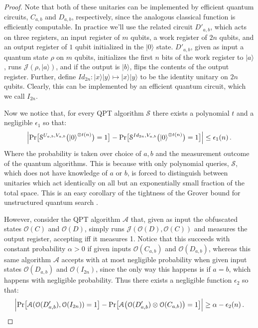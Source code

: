 \documentclass[11pt]{article}
\numberwithin{equation}{section}
\newcommand{\algo}{\mathcal}
\begin{document}
{\begin{proof}
Note that both of these unitaries can be implemented by efficient quantum circuits, $C_{a,b}$ and $D_{a,b}$, respectively, since the analogous classical function is efficiently computable.  In practice we'll use the related circuit $D'_{a,b}$, which acts on three registers, an input register of $m$ qubits, a work register of $2n$ qubits, and an output register of $1$ qubit initialized in the $|0\rangle$ state.  $D'_{a,b}$, given as input a quantum state $\rho$ on $m$ qubits, initializes the first $n$ bits of the work register to $|a\rangle$, runs $\mathcal{J}(\rho,|a\rangle)$, and if the output is $|b\rangle$, flips the contents of the output register.  Further, define $Id_{2n}:|x\rangle|y\rangle\longmapsto|x\rangle|y\rangle$ to be the identity unitary on $2n$ qubits.  Clearly, this can be implemented by an efficient quantum circuit, which we call $I_{2n}$.

Now we notice that, for every QPT algorithm $\mathcal S$ there exists a polynomial $t$ and a negligible $\epsilon_1$ so that:
\begin{equation}\label{eqn1}\Bigl| \text{Pr}\bigl[\mathcal S^{U_{a,b}, V_{a,b}}\bigl({\left\vert{0}\right\rangle}^{\otimes t(n)}\bigr) = 1\bigr]- \text{Pr}\bigl[\mathcal S^{Id_{2n}, V_{a,b}}\bigl({\left\vert{0}\right\rangle}^{\otimes t(n)}\bigr) = 1\bigr] \Bigr| \leq \epsilon_1(n)\,.\end{equation}
Where the probability is taken over choice of $a,b$ and the measurement outcome of the quantum algorithms.
 This is because with only polynomial queries, $\mathcal S$, which does not have knowledge of $a$ or $b$, is forced to distinguish between unitaries which act identically on all but an exponentially small fraction of the total space.  This is an easy corollary of the tightness of the Grover bound for unstructured quantum search \cite{BBBV}.
  
However, consider the QPT algorithm $\mathcal{A}$ that, given as input the obfuscated states $\mathcal{O}(C)$ and $\mathcal{O}(D)$, simply runs $\mathcal{J}(\mathcal{O}(D),\mathcal{O}(C))$ and measures the output register, accepting iff it measures 1.  Notice that this succeeds with constant probability $\alpha>0$ if given inputs $\mathcal{O}(C_{a,b})$ and $\mathcal{O}(D_{a,b})$, whereas this same algorithm $\algo A$ accepts with at most negligible probability when given input states $\mathcal{O}(D_{a,b})$ and $\mathcal{O}(I_{2n})$, since the only way this happens is if $a=b$, which happens with negligible probability.  
Thus there exists a negligible function $\epsilon_2$ so that:
\begin{equation}\label{eqn2}\Bigl| \text{Pr}\bigl[\mathcal A(\mathcal{O}(D'_{a,b}),\mathcal{O}(I_{2n})) = 1\bigr]- \text{Pr}\bigl[\mathcal A\bigl(\mathcal{O}(D'_{a,b})\otimes\mathcal{O}(C_{a,b})\bigr) = 1\bigr] \Bigr| \geq \alpha-\epsilon_2(n)\,.\end{equation}


\end{proof}}
\end{document}
